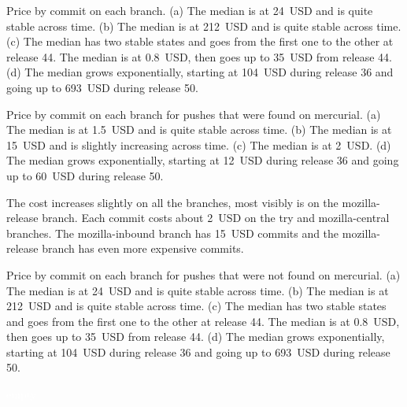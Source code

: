 {
    Price by commit on each branch. (a) The median is at 24~USD and is quite stable across time. (b) The median is at 212~USD and is quite stable across time.  (c) The median has two stable states and goes from the first one to the other at release 44. The median is at 0.8~USD, then goes up to 35~USD from release 44. (d) The median grows exponentially, starting at 104~USD during release 36 and going up to 693~USD during release 50.
}
{
    
}
{
    Price by commit on each branch for pushes that were found on mercurial. (a) The median is at 1.5~USD and is quite stable across time. (b) The median is at 15~USD and is slightly increasing across time.  (c) The median is at 2~USD. (d) The median grows exponentially, starting at 12~USD during release 36 and going up to 60~USD during release 50.
}
{
    
    The cost increases slightly on all the branches, most visibly is on the mozilla-release branch. Each commit costs about 2~USD on the try and mozilla-central branches. The mozilla-inbound branch has 15~USD commits and the mozilla-release branch has even more expensive commits.
}
{
    Price by commit on each branch for pushes that were not found on mercurial. (a) The median is at 24~USD and is quite stable across time. (b) The median is at 212~USD and is quite stable across time.  (c) The median has two stable states and goes from the first one to the other at release 44. The median is at 0.8~USD, then goes up to 35~USD from release 44. (d) The median grows exponentially, starting at 104~USD during release 36 and going up to 693~USD during release 50.
}
{
    
}
\textcolor{white}{empty}
\newpage